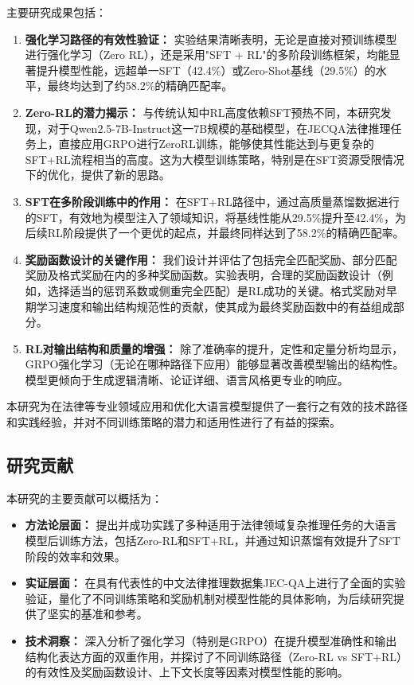 \documentclass{pkuthesis}
\newcommand{\qwen}{Qwen2.5-7B-Instruct}
\begin{document}
主要研究成果包括：
\begin{enumerate}
    \item \textbf{强化学习路径的有效性验证：} 实验结果清晰表明，无论是直接对预训练模型进行强化学习（Zero RL），还是采用"SFT + RL"的多阶段训练框架，均能显著提升模型性能，远超单一SFT（42.4\%）或Zero-Shot基线（29.5\%）的水平，最终均达到了约58.2\%的精确匹配率。
    \item \textbf{Zero-RL的潜力揭示：} 与传统认知中RL高度依赖SFT预热不同，本研究发现，对于\qwen 这一7B规模的基础模型，在JEC\-QA法律推理任务上，直接应用GRPO进行Zero\-RL训练，能够使其性能达到与更复杂的SFT+RL流程相当的高度。这为大模型训练策略，特别是在SFT资源受限情况下的优化，提供了新的思路。
    \item \textbf{SFT在多阶段训练中的作用：} 在SFT+RL路径中，通过高质量蒸馏数据进行的SFT，有效地为模型注入了领域知识，将基线性能从29.5\%提升至42.4\%，为后续RL阶段提供了一个更优的起点，并最终同样达到了58.2\%的精确匹配率。
    \item \textbf{奖励函数设计的关键作用：} 我们设计并评估了包括完全匹配奖励、部分匹配奖励及格式奖励在内的多种奖励函数。实验表明，合理的奖励函数设计（例如，选择适当的惩罚系数或侧重完全匹配）是RL成功的关键。格式奖励对早期学习速度和输出结构规范性的贡献，使其成为最终奖励函数中的有益组成部分。
    \item \textbf{RL对输出结构和质量的增强：} 除了准确率的提升，定性和定量分析均显示，GRPO强化学习（无论在哪种路径下应用）能够显著改善模型输出的结构性。模型更倾向于生成逻辑清晰、论证详细、语言风格更专业的响应。
\end{enumerate}
本研究为在法律等专业领域应用和优化大语言模型提供了一套行之有效的技术路径和实践经验，并对不同训练策略的潜力和适用性进行了有益的探索。

\subsection{研究贡献}
本研究的主要贡献可以概括为：
\begin{itemize}
    \item \textbf{方法论层面：} 提出并成功实践了多种适用于法律领域复杂推理任务的大语言模型后训练方法，包括Zero-RL和SFT+RL，并通过知识蒸馏有效提升了SFT阶段的效率和效果。
    \item \textbf{实证层面：} 在具有代表性的中文法律推理数据集JEC-QA上进行了全面的实验验证，量化了不同训练策略和奖励机制对模型性能的具体影响，为后续研究提供了坚实的基准和参考。
    \item \textbf{技术洞察：} 深入分析了强化学习（特别是GRPO）在提升模型准确性和输出结构化表达方面的双重作用，并探讨了不同训练路径（Zero-RL vs SFT+RL）的有效性及奖励函数设计、上下文长度等因素对模型性能的影响。
\end{itemize}
\end{document}
